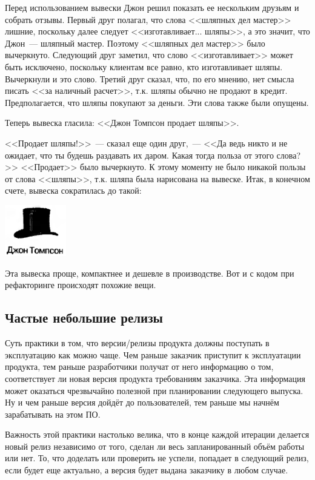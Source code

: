 \documentclass{../../text-style}
\begin{document}
Перед использованием вывески Джон решил показать ее нескольким друзьям и собрать отзывы. Первый друг полагал, что слова <<шляпных дел мастер>> лишние, поскольку далее следует <<изготавливает... шляпы>>, а это значит, что Джон~--- шляпный мастер. Поэтому <<шляпных дел мастер>> было вычеркнуто. Следующий друг заметил, что слово <<изготавливает>> может быть исключено, поскольку клиентам все равно, кто изготавливает шляпы. Вычеркнули и это слово. Третий друг сказал, что, по его мнению, нет смысла писать <<за наличный расчет>>, т.к. шляпы обычно не продают в кредит. Предполагается, что шляпы покупают за деньги. Эти слова также были опущены.

Теперь вывеска гласила: <<Джон Томпсон продает шляпы>>.

<<Продает шляпы!>>~--- сказал еще один друг,~--- <<Да ведь никто и не ожидает, что ты будешь раздавать их даром. Какая тогда польза от этого слова?>> <<Продает>> было вычеркнуто. К этому моменту не было никакой пользы от слова <<шляпы>>, т.к. шляпа была нарисована на вывеске. Итак, в конечном счете, вывеска сократилась до такой:

\begin{center}
    \includegraphics[width=0.2\textwidth]{hatsRefactoringFinal.png}
\end{center}

Эта вывеска проще, компактнее и дешевле в производстве. Вот и с кодом при рефакторинге происходят похожие вещи.

\subsection{Частые небольшие релизы}

Суть практики в том, что версии/релизы продукта должны поступать в эксплуатацию как можно чаще. Чем раньше заказчик приступит к эксплуатации продукта, тем раньше разработчики получат от него информацию о том, соответствует ли новая версия продукта требованиям заказчика. Эта информация может оказаться чрезвычайно полезной при планировании следующего выпуска. Ну и чем раньше версия дойдёт до пользователей, тем раньше мы начнём зарабатывать на этом ПО.

Важность этой практики настолько велика, что в конце каждой итерации делается новый релиз независимо от того, сделан ли весь запланированный объём работы или нет. То, что доделать или проверить не успели, попадает в следующий релиз, если будет еще актуально, а версия будет выдана заказчику в любом случае.
\end{document}
